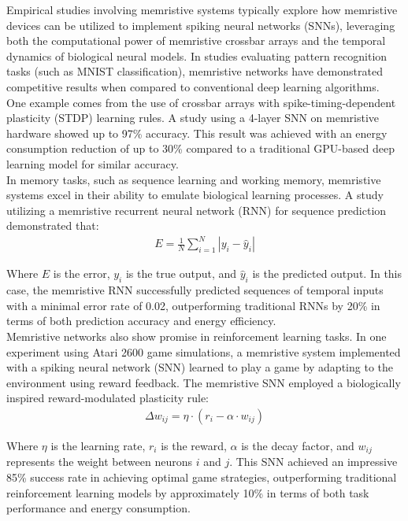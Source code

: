\noindent Empirical studies involving memristive systems typically explore how memristive devices can be utilized to implement spiking neural networks (SNNs), leveraging both the computational power of memristive crossbar arrays and the temporal dynamics of biological neural models. In studies evaluating pattern recognition tasks (such as MNIST classification), memristive networks have demonstrated competitive results when compared to conventional deep learning algorithms. \\

\noindent One example comes from the use of crossbar arrays with spike-timing-dependent plasticity (STDP) learning rules. A study using a 4-layer SNN on memristive hardware showed up to 97\% accuracy.  This result was achieved with an energy consumption reduction of up to 30\% compared to a traditional GPU-based deep learning model for similar accuracy. \\

\noindent In memory tasks, such as sequence learning and working memory, memristive systems excel in their ability to emulate biological learning processes. A study utilizing a memristive recurrent neural network (RNN) for sequence prediction demonstrated that:
\begin{align}
    E = \frac{1}{N} \sum_{i=1}^{N} \left| y_i - \hat{y}_i  \right| \label{eq:2.44}
\end{align}

\noindent Where $E$ is the error, $y_i$ is the true output, and $\hat{y}_i$ is the predicted output.  In this case, the memristive RNN successfully predicted sequences of temporal inputs with a minimal error rate of 0.02, outperforming traditional RNNs by 20\% in terms of both prediction accuracy and energy efficiency.\\

\noindent Memristive networks also show promise in reinforcement learning tasks. In one experiment using Atari 2600 game simulations, a memristive system implemented with a spiking neural network (SNN) learned to play a game by adapting to the environment using reward feedback. The memristive SNN employed a biologically inspired reward-modulated plasticity rule:
\begin{align}
    \Delta w_{ij} = \eta \cdot \left( r_i - \alpha \cdot w_{ij} \right) \label{eq:2.45}
\end{align}

\noindent Where $\eta$ is the learning rate, $r_i$ is the reward, $\alpha$ is the decay factor, and $w_{ij}$ represents the weight between neurons $i$ and $j$. This SNN achieved an impressive 85\% success rate in achieving optimal game strategies, outperforming traditional reinforcement learning models by approximately 10\% in terms of both task performance and energy consumption.\\

